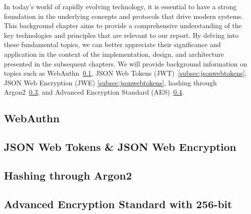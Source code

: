 
In today's world of rapidly evolving technology, it is essential to have a
strong foundation in the underlying concepts and protocols that drive modern
systems.
This background chapter aims to provide a comprehensive understanding of the key
technologies and principles that are relevant to our report.
By delving into these fundamental topics, we can better appreciate their
significance and application in the context of the implementation, design, and
architecture presented in the subsequent chapters.
We will provide background information on topics such as WebAuthn~\ref{subsec:webauthn},
JSON Web Tokens (JWT)~\ref{subsec:jsonwebtokens}, JSON Web Encryption (JWE)
\ref{subsec:jsonwebtokens}, hashing through Argon2~\ref{subsec:hashing-through-argon2},
and Advanced Encryption Standard (AES)~\ref{subsec:aes}.




\newcommand{\credIdentifier}{\footnote{There is a requirement to check whether the credential identifier, generated by the Authenticator
device exsits on the server.
For further discussions on this topic, see section \hyperref[sec:futurework]{Future work}}}

\newcommand{\navigatorApi}{\footnote{In LessPM's case, this is the \textit{navigator.credentials} API provided by the browser.}}

\subsection{WebAuthn}\label{subsec:webauthn}


\subsection{JSON Web Tokens \& JSON Web Encryption}\label{subsec:json-web-tokens}\label{subsec:jsonwebtokens}


\subsection{Hashing through Argon2}\label{subsec:hashing-through-argon2}


\subsection{Advanced Encryption Standard with 256-bit}\label{subsec:aes}
